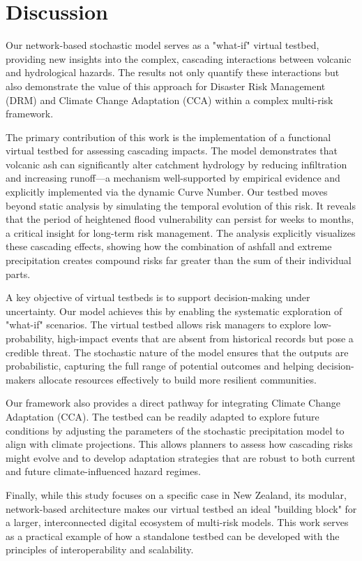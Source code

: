\documentclass[12pt, a4paper]{article}
\begin{document}
\section{Discussion}
Our network-based stochastic model serves as a "what-if" virtual testbed, providing new insights into the complex, cascading interactions between volcanic and hydrological hazards. The results not only quantify these interactions but also demonstrate the value of this approach for Disaster Risk Management (DRM) and Climate Change Adaptation (CCA) within a complex multi-risk framework.

The primary contribution of this work is the implementation of a functional virtual testbed for assessing cascading impacts. The model demonstrates that volcanic ash can significantly alter catchment hydrology by reducing infiltration and increasing runoff—a mechanism well-supported by empirical evidence and explicitly implemented via the dynamic Curve Number. Our testbed moves beyond static analysis by simulating the temporal evolution of this risk. It reveals that the period of heightened flood vulnerability can persist for weeks to months, a critical insight for long-term risk management. The analysis explicitly visualizes these cascading effects, showing how the combination of ashfall and extreme precipitation creates compound risks far greater than the sum of their individual parts.

A key objective of virtual testbeds is to support decision-making under uncertainty. Our model achieves this by enabling the systematic exploration of "what-if" scenarios. The virtual testbed allows risk managers to explore low-probability, high-impact events that are absent from historical records but pose a credible threat. The stochastic nature of the model ensures that the outputs are probabilistic, capturing the full range of potential outcomes and helping decision-makers allocate resources effectively to build more resilient communities.

Our framework also provides a direct pathway for integrating Climate Change Adaptation (CCA). The testbed can be readily adapted to explore future conditions by adjusting the parameters of the stochastic precipitation model to align with climate projections. This allows planners to assess how cascading risks might evolve and to develop adaptation strategies that are robust to both current and future climate-influenced hazard regimes.

Finally, while this study focuses on a specific case in New Zealand, its modular, network-based architecture makes our virtual testbed an ideal "building block" for a larger, interconnected digital ecosystem of multi-risk models. This work serves as a practical example of how a standalone testbed can be developed with the principles of interoperability and scalability.
\end{document}
